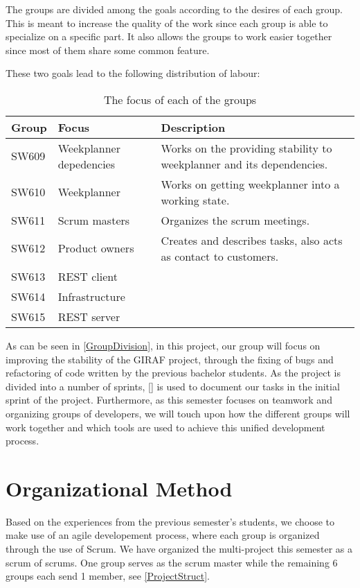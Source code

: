The groups are divided among the goals according to the desires of each group.
This is meant to increase the quality of the work since each group is able to
specialize on a specific part. It also allows the groups to work easier together
since most of them share some common feature.

 These two goals lead to the
following distribution of labour:

\begin{table}[H]
\centering
\begin{tabular}{|p{2cm}|p{3cm}|p{8cm}|}
\hline
Group & Focus & Description \\ \hline
SW609 & Weekplanner depedencies & Works on the providing stability to
weekplanner and its dependencies.\\\hline 
SW610 & Weekplanner & Works on getting weekplanner into a working
state.\\
\hline SW611 & Scrum masters & Organizes the scrum meetings. \\\hline 
SW612 & Product owners & Creates and describes tasks, also acts as contact to
customers. \\\hline 
SW613 & REST client & \\ \hline

SW614 & Infrastructure & \\ \hline

SW615 & REST server & \\ \hline

\end{tabular}
\caption{The focus of each of the groups}
\label{GroupDivision}
\end{table}

As can be seen in \autoref{GroupDivision}, in this project, our group will focus
on improving the stability of the GIRAF project, through the fixing of bugs and
refactoring of code written by the previous bachelor students. As the project is
divided into a number of sprints, \autoref{} is used to document our tasks in
the initial sprint of the project. Furthermore, as this semester focuses on
teamwork and organizing groups of developers, we will touch upon how the
different groups will work together and which tools are used to achieve this
unified development process.

\section{Organizational Method}

Based on the experiences from the previous semester's students, we choose to
make use of an agile developement process, where each group is organized
through the use of Scrum. We have organized the multi-project this semester as
a scrum of scrums. One group serves as the scrum master while the remaining 6
groups each send 1 member, see \autoref{ProjectStruct}.

